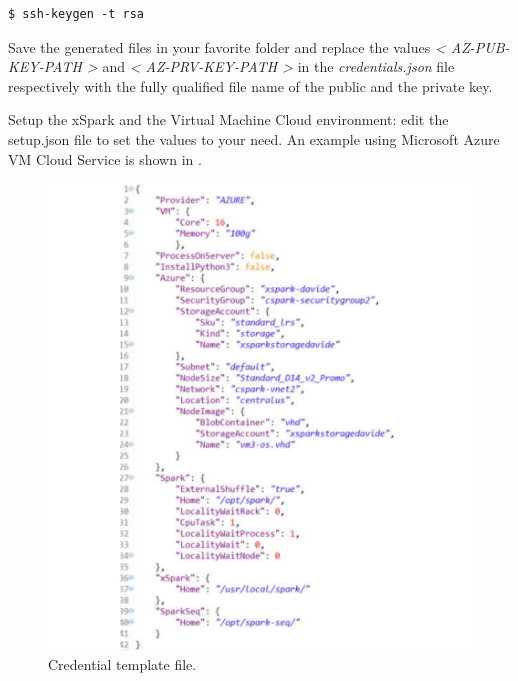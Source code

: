 \begin{verbatim}
$ ssh-keygen -t rsa
\end{verbatim}

Save the generated files in your favorite folder and replace the values
\emph{\textless{} AZ-PUB-KEY-PATH \textgreater{}} and \emph{\textless{}
AZ-PRV-KEY-PATH \textgreater{}} in the \emph{credentials.json} file
respectively with the fully qualified file name of the public and the
private key.

Setup the xSpark and the Virtual Machine Cloud environment: edit the 
setup.json file to set the values to your need. An
example using Microsoft Azure VM Cloud Service is shown in .

\begin{figure}[thbp]
	\hspace*{-2.5cm}
	\centering
	\includegraphics[width=18cm]{images/xspark_dagsymb_setup.pdf}
	\caption{Credential template file.}
	\label{fig:xspark_dagsymb_setup}
\end{figure}


